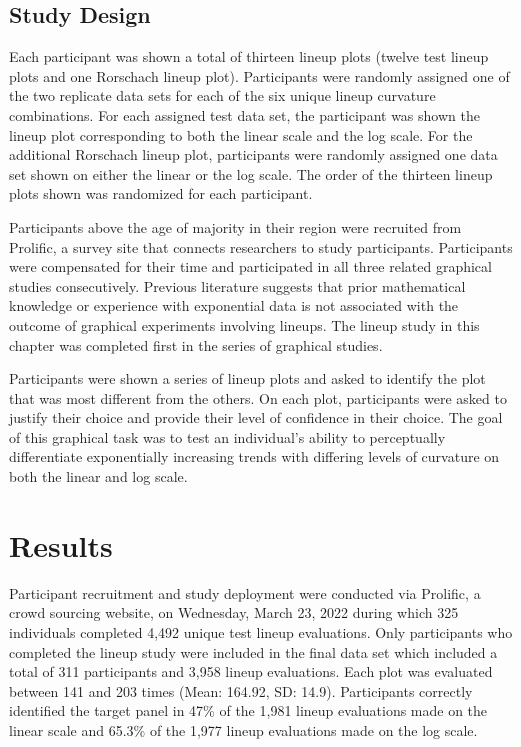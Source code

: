 \documentclass[12pt]{article}
\begin{document}
\hypertarget{study-design}{%
\subsection{Study Design}\label{study-design}}

Each participant was shown a total of thirteen lineup plots (twelve test
lineup plots and one Rorschach lineup plot). Participants were randomly
assigned one of the two replicate data sets for each of the six unique
lineup curvature combinations. For each assigned test data set, the
participant was shown the lineup plot corresponding to both the linear
scale and the log scale. For the additional Rorschach lineup plot,
participants were randomly assigned one data set shown on either the
linear or the log scale. The order of the thirteen lineup plots shown
was randomized for each participant.

Participants above the age of majority in their region were recruited
from Prolific, a survey site that connects researchers to study
participants. Participants were compensated for their time and
participated in all three related graphical studies consecutively.
Previous literature suggests that prior mathematical knowledge or
experience with exponential data is not associated with the outcome of
graphical experiments involving lineups\citep{vanderplas2015spatial}.
The lineup study in this chapter was completed first in the series of
graphical studies.

Participants were shown a series of lineup plots and asked to identify
the plot that was most different from the others. On each plot,
participants were asked to justify their choice and provide their level
of confidence in their choice. The goal of this graphical task was to
test an individual's ability to perceptually differentiate exponentially
increasing trends with differing levels of curvature on both the linear
and log scale.

\hypertarget{results}{%
\section{Results}\label{results}}

Participant recruitment and study deployment were conducted via
Prolific, a crowd sourcing website, on Wednesday, March 23, 2022 during
which 325 individuals completed 4,492 unique test lineup evaluations.
Only participants who completed the lineup study were included in the
final data set which included a total of 311 participants and 3,958
lineup evaluations. Each plot was evaluated between 141 and 203 times
(Mean: 164.92, SD: 14.9). Participants correctly identified the target
panel in 47\% of the 1,981 lineup evaluations made on the linear scale
and 65.3\% of the 1,977 lineup evaluations made on the log scale.
\end{document}
